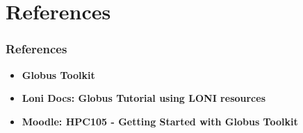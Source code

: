 \documentclass[slidestop,mathserif,compress,xcolor=svgnames]{beamer}
\begin{document}
\section{References}
\begin{frame}
 \frametitle{{\tiny References}}
\begin{block}{}
\begin{itemize}
 \item \footnotesize{{\bf Globus Toolkit}\\}
 \item \footnotesize{{\bf Loni Docs: Globus Tutorial using LONI resources}\\}
 \item \footnotesize{{\bf Moodle: HPC105 - Getting Started with Globus Toolkit}\\}
\end{itemize}
\end{block}

\end{frame}
\end{document}
